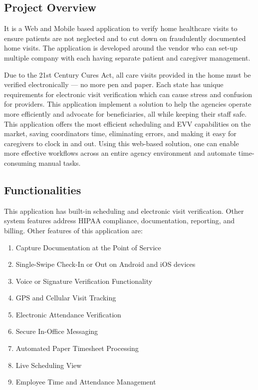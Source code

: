 \subsection{Project Overview}

It is a Web and Mobile based application to verify home healthcare visits to ensure patients are not neglected and to cut down on fraudulently documented home visits.
The application is developed around the vendor who can set-up multiple company with each having separate patient and caregiver management.

Due to the 21st Century Cures Act, all care visits provided in the home must be verified electronically — no more pen and paper.
Each state has unique requirements for electronic visit verification which can cause stress and confusion for providers.
This application implement a solution to help the agencies operate more efficiently and advocate for beneficiaries, all while keeping their staff safe. \\

This application offers the most efficient scheduling and EVV capabilities on the market, saving coordinators time, eliminating errors, and making it easy for caregivers to clock in and out.
Using this web-based solution, one can enable more effective workflows across an entire agency environment and automate time-consuming manual tasks.


\subsection{Functionalities}

This application has built-in scheduling and electronic visit verification.
Other system features address HIPAA compliance, documentation, reporting, and billing.
Other features of this application are:

\begin{enumerate}
    \item Capture Documentation at the Point of Service 
    \item Single-Swipe Check-In or Out on Android and iOS devices
    \item Voice or Signature Verification Functionality
    \item GPS and Cellular Visit Tracking
    \item Electronic Attendance Verification
    \item Secure In-Office Messaging
    \item Automated Paper Timesheet Processing
    \item Live Scheduling View
    \item Employee Time and Attendance Management
\end{enumerate}

